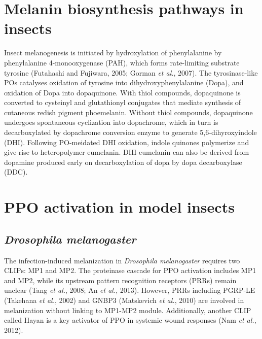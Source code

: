 \documentclass[11pt]{article}
\begin{document}
\section{Melanin biosynthesis pathways in insects}
Insect melanogenesis is initiated by hydroxylation of phenylalanine by phenylalanine 4-monooxygenase (PAH), which forms rate-limiting substrate tyrosine (Futahashi and Fujiwara, 2005; Gorman \textit{et al.}, 2007). 
The tyrosinase-like POs catalyses oxidation of tyrosine into dihydroxyphenylalanine (Dopa), and oxidation of Dopa into dopaquinone. 
With thiol compounds, dopaquinone is converted to cysteinyl and glutathionyl conjugates that mediate synthesis of cutaneous redish pigment phoemelanin. 
Without thiol compounds, dopaquinone undergoes spontaneous cyclization into dopachrome, which in turn is decarboxylated by dopachrome conversion enzyme to generate 5,6-dihyroxyindole (DHI). 
Following PO-meidated DHI oxidation, indole quinones polymerize and give rise to heteropolymer eumelanin. 
DHI-eumelanin can also be derived from dopamine produced early on decarboxylation of dopa by dopa decarboxylase (DDC). 

\section{PPO activation in model insects}
\subsection{\textit{Drosophila melanogaster}}
The infection-induced melanization in \textit{Drosophila melanogaster} requires two CLIPs: MP1 and MP2. 
The proteinase cascade for PPO activation includes MP1 and MP2, while its upstream pattern recognition receptors (PRRs) remain unclear (Tang \textit{et al.}, 2008; An \textit{et al.}, 2013). 
However, PRRs including PGRP-LE (Takehana \textit{et al.}, 2002) and GNBP3 (Matskevich \textit{et al.}, 2010) are involved in melanization without linking to MP1-MP2 module. 
Additionally, another CLIP called Hayan is a key activator of PPO in systemic wound responses (Nam \textit{et al.}, 2012). 
\end{document}
